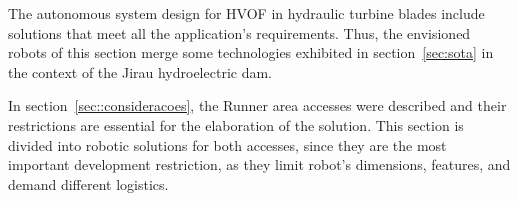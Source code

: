 The autonomous system design for HVOF in hydraulic turbine blades include
solutions that meet all the application's requirements. Thus, the envisioned
robots of this section merge some technologies exhibited in
section~\ref{sec:sota} in the context of the Jirau hydroelectric dam.


In section~\ref{sec::consideracoes}, the Runner area accesses were described
and their restrictions are essential for the elaboration of the solution.
This section is divided into robotic solutions for both accesses, since they
are the most important development restriction, as they limit robot's
dimensions, features, and demand different logistics.

